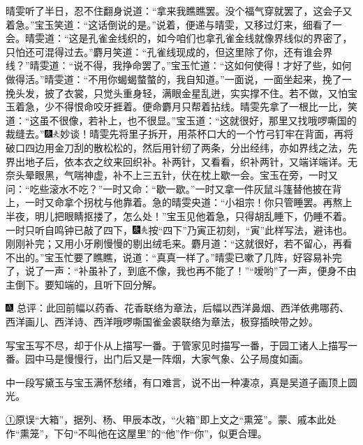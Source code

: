 晴雯听了半日，忍不住翻身说道：``拿来我瞧瞧罢。没个福气穿就罢了，这会子又着急。''宝玉笑道：``这话倒说的是。''说着，便递与晴雯，又移过灯来，细看了一会。晴雯道：``这是孔雀金线织的，如今咱们也拿孔雀金线就像界线似的界密了，只怕还可混得过去。''麝月笑道：``孔雀线现成的，但这里除了你，还有谁会界线？''晴雯道：``说不得，我挣命罢了。''宝玉忙道：``这如何使得！才好了些，如何做得活。''晴雯道：``不用你蝎蝎螫螫的，我自知道。''一面说，一面坐起来，挽了一挽头发，披了衣裳，只觉头重身轻，满眼金星乱迸，实实撑不住。若不做，又怕宝玉着急，少不得恨命咬牙捱着。便命麝月只帮着拈线。晴雯先拿了一根比一比，笑道：``这虽不很像，若补上，也不很显。''宝玉道：``这就很好，那里又找哦啰嘶国的裁缝去。''{\includegraphics[width=3mm]{../Images/00004}\includegraphics[width=3mm]{../Images/00012}\footnotesize \kaishu 妙谈！}晴雯先将里子拆开，用茶杯口大的一个竹弓钉牢在背面，再将破口四边用金刀刮的散松松的，然后用针纫了两条，分出经纬，亦如界线之法，先界出地子后，依本衣之纹来回织补。补两针，又看看，织补两针，又端详端详。无奈头晕眼黑，气喘神虚，补不上三五针，伏在枕上歇一会。宝玉在旁，一时又问：``吃些滚水不吃？''一时又命：``歇一歇。''一时又拿一件灰鼠斗篷替他披在背上，一时又命拿个拐枕与他靠着。急的晴雯央道：``小祖宗！你只管睡罢。再熬上半夜，明儿把眼睛抠搂了，怎么处！''宝玉见他着急，只得胡乱睡下，仍睡不着。一时只听自鸣钟已敲了四下，{\includegraphics[width=3mm]{../Images/00004}\includegraphics[width=3mm]{../Images/00012}\footnotesize \kaishu 按``四下''乃寅正初刻，``寅''此样写法，避讳也。}刚刚补完；又用小牙刷慢慢的剔出绒毛来。麝月道：``这就很好，若不留心，再看不出的。''宝玉忙要了瞧瞧，说道：``真真一样了。''晴雯已嗽了几阵，好容易补完了，说了一声：``补虽补了，到底不像，我也再不能了！''``嗳哟''了一声，便身不由主倒下。要知端的，且听下回分解。

{\includegraphics[width=3mm]{../Images/00005}  \kaishu 总评：此回前幅以药香、花香联络为章法，后幅以西洋鼻烟、西洋依弗哪药、西洋画儿、西洋诗、西洋哦}啰{嘶国雀金裘联络为章法，极穿插映带之妙。}

{写宝玉写不尽，却于仆从上描写一番。于管家见时描写一番，于园工诸人上描写一番。园中马是慢慢行，出门后又是一阵烟，大家气象、公子局度如画。}

{中一段写黛玉与宝玉满怀愁绪，有口难言，说不出一种凄凉，真是吴道子画顶上圆光。}

{\href{../Text/part0056_split_000.html\#navto_1_a}{①}原误``大箱''，据列、杨、甲辰本改，``火箱''即上文之``熏笼''。蒙、戚本此处作``熏笼''，下句``不叫他在这屋里''的``他''作``你''，似更合理。}
